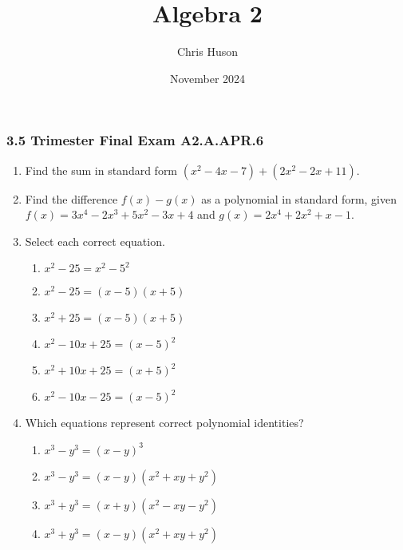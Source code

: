 \documentclass[12pt, twoside]{article}
\title{Algebra 2}
\author{Chris Huson}
\date{November 2024}
\begin{document}
\subsubsection*{3.5 Trimester Final Exam \hfill A2.A.APR.6}
\begin{enumerate}[itemsep=0.5cm]
\subsubsection*{A2-APR.1 Perform operations with polynomials}
\item Find the sum in standard form $(x^2 - 4x - 7) + (2x^2 - 2x + 11)$. \vspace{5cm}

\item Find the difference $f(x)-g(x)$ as a polynomial in standard form, given \\[0.25cm]
    $f(x)= 3x^4 - 2x^3 + 5x^2 - 3x + 4$ and $g(x)= 2x^4 + 2x^2 + x - 1$.  \vspace{5cm}

\item Select each correct equation.
\begin{multicols}{2}
    \begin{enumerate}
    \item $x^2 - 25 = x^2 - 5^2$
    \item $x^2 - 25 = (x-5)(x+5)$
    \item $x^2 + 25 = (x-5)(x+5)$
    \item $x^2 - 10x + 25 = (x-5)^2$
    \item $x^2 + 10x + 25 = (x+5)^2$
    \item $x^2 - 10x - 25 = (x-5)^2$
    \end{enumerate}
\end{multicols}

        
\item Which equations represent correct polynomial identities?
\begin{multicols}{2}
    \begin{enumerate}
    \item \(x^3 - y^3 = (x - y)^3\)
    \item \(x^3 - y^3 = (x - y)(x^2 + xy + y^2)\)
    \item \(x^3 + y^3 = (x + y)(x^2 - xy - y^2)\)
    \item \(x^3 + y^3 = (x - y)(x^2 + xy + y^2)\)
\end{enumerate}
\end{multicols}
    

\end{enumerate}
\end{document}

